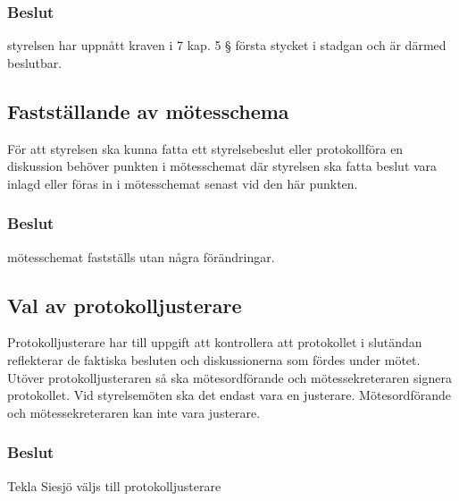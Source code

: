 \documentclass[protokoll]{dvd}
\begin{document}
        \subsubsection*{Beslut}

        \begin{attsatser}
            \item styrelsen har uppnått kraven i 7 kap. 5 § första stycket i stadgan och är därmed beslutbar.
        \end{attsatser}

    \subsection{Fastställande av mötesschema}

        För att styrelsen ska kunna fatta ett styrelsebeslut eller protokollföra en diskussion behöver punkten i mötesschemat där styrelsen ska fatta beslut vara inlagd eller föras in i mötesschemat senast vid den här punkten.

        \subsubsection*{Beslut}

        \begin{attsatser}
            \item mötesschemat fastställs utan några förändringar.
        \end{attsatser}


    \subsection{Val av protokolljusterare}

        Protokolljusterare har till uppgift att kontrollera att protokollet i slutändan reflekterar de faktiska besluten och diskussionerna som fördes under mötet.
        Utöver protokolljusteraren så ska mötesordförande och mötessekreteraren signera protokollet.
        Vid styrelsemöten ska det endast vara en justerare.
        Mötesordförande och mötessekreteraren kan inte vara justerare.

        \subsubsection*{Beslut}

        \begin{attsatser}
            \item Tekla Siesjö väljs till protokolljusterare
        \end{attsatser}
\end{document}
